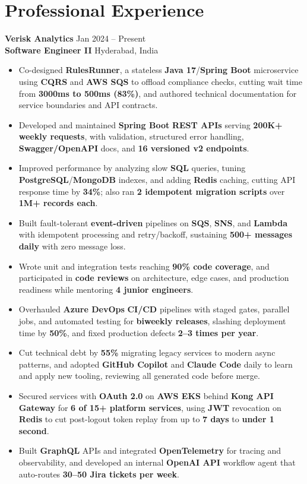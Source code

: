 \documentclass[a4paper,10pt]{article}
\begin{document}
\section*{Professional Experience}

\textbf{Verisk Analytics} \hfill Jan 2024 -- Present \\
\textbf{Software Engineer II} \hfill Hyderabad, India

\begin{itemize}[leftmargin=*]
    \item Co-designed \textbf{RulesRunner}, a stateless \textbf{Java 17}/\textbf{Spring Boot} microservice using \textbf{CQRS} and \textbf{AWS SQS} to offload compliance checks, cutting wait time from \textbf{3000ms to 500ms (83\%)}, and authored technical documentation for service boundaries and API contracts.
    \item Developed and maintained \textbf{Spring Boot} \textbf{REST APIs} serving \textbf{200K+ weekly requests}, with validation, structured error handling, \textbf{Swagger/OpenAPI} docs, and \textbf{16 versioned v2 endpoints}.
    \item Improved performance by analyzing slow \textbf{SQL} queries, tuning \textbf{PostgreSQL}/\textbf{MongoDB} indexes, and adding \textbf{Redis} caching, cutting API response time by \textbf{34\%}; also ran \textbf{2 idempotent migration scripts} over \textbf{1M+ records each}.
    \item Built fault-tolerant \textbf{event-driven} pipelines on \textbf{SQS}, \textbf{SNS}, and \textbf{Lambda} with idempotent processing and retry/backoff, sustaining \textbf{500+ messages daily} with zero message loss.
    \item Wrote unit and integration tests reaching \textbf{90\% code coverage}, and participated in \textbf{code reviews} on architecture, edge cases, and production readiness while mentoring \textbf{4 junior engineers}.
    \item Overhauled \textbf{Azure DevOps} \textbf{CI/CD} pipelines with staged gates, parallel jobs, and automated testing for \textbf{biweekly releases}, slashing deployment time by \textbf{50\%}, and fixed production defects \textbf{2--3 times per year}.
    \item Cut technical debt by \textbf{55\%} migrating legacy services to modern async patterns, and adopted \textbf{GitHub Copilot} and \textbf{Claude Code} daily to learn and apply new tooling, reviewing all generated code before merge.
    \item Secured services with \textbf{OAuth 2.0} on \textbf{AWS EKS} behind \textbf{Kong API Gateway} for \textbf{6 of 15+ platform services}, using \textbf{JWT} revocation on \textbf{Redis} to cut post-logout token replay from up to \textbf{7 days} to \textbf{under 1 second}.
    \item Built \textbf{GraphQL} APIs and integrated \textbf{OpenTelemetry} for tracing and observability, and developed an internal \textbf{OpenAI API} workflow agent that auto-routes \textbf{30--50 Jira tickets per week}.
\end{itemize}
\end{document}
